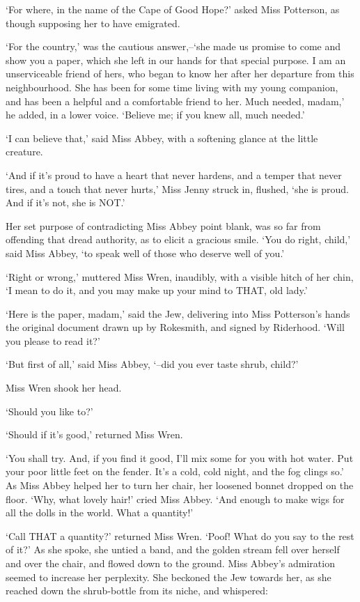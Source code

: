 ‘For where, in the name of the Cape of Good Hope?’ asked Miss Potterson,
as though supposing her to have emigrated.

‘For the country,’ was the cautious answer,--‘she made us promise to
come and show you a paper, which she left in our hands for that special
purpose. I am an unserviceable friend of hers, who began to know her
after her departure from this neighbourhood. She has been for some time
living with my young companion, and has been a helpful and a comfortable
friend to her. Much needed, madam,’ he added, in a lower voice. ‘Believe
me; if you knew all, much needed.’

‘I can believe that,’ said Miss Abbey, with a softening glance at the
little creature.

‘And if it’s proud to have a heart that never hardens, and a temper
that never tires, and a touch that never hurts,’ Miss Jenny struck in,
flushed, ‘she is proud. And if it’s not, she is NOT.’

Her set purpose of contradicting Miss Abbey point blank, was so far from
offending that dread authority, as to elicit a gracious smile. ‘You do
right, child,’ said Miss Abbey, ‘to speak well of those who deserve well
of you.’

‘Right or wrong,’ muttered Miss Wren, inaudibly, with a visible hitch of
her chin, ‘I mean to do it, and you may make up your mind to THAT, old
lady.’

‘Here is the paper, madam,’ said the Jew, delivering into Miss
Potterson’s hands the original document drawn up by Rokesmith, and
signed by Riderhood. ‘Will you please to read it?’

‘But first of all,’ said Miss Abbey, ‘--did you ever taste shrub,
child?’

Miss Wren shook her head.

‘Should you like to?’

‘Should if it’s good,’ returned Miss Wren.

‘You shall try. And, if you find it good, I’ll mix some for you with hot
water. Put your poor little feet on the fender. It’s a cold, cold night,
and the fog clings so.’ As Miss Abbey helped her to turn her chair, her
loosened bonnet dropped on the floor. ‘Why, what lovely hair!’ cried
Miss Abbey. ‘And enough to make wigs for all the dolls in the world.
What a quantity!’

‘Call THAT a quantity?’ returned Miss Wren. ‘Poof! What do you say to
the rest of it?’ As she spoke, she untied a band, and the golden stream
fell over herself and over the chair, and flowed down to the ground.
Miss Abbey’s admiration seemed to increase her perplexity. She beckoned
the Jew towards her, as she reached down the shrub-bottle from its
niche, and whispered:

